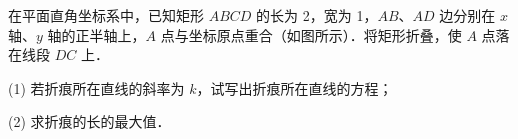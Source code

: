 \begin{question}
在平面直角坐标系中，已知矩形 $ABCD$ 的长为 2，宽为 1，$AB$、$AD$ 边分别在 $x$ 轴、$y$ 轴的正半轴上，$A$ 点与坐标原点重合（如图所示）．将矩形折叠，使 $A$ 点落在线段 $DC$ 上．
\nopagebreak[4]
\begin{center}\end{center}
\nopagebreak[4]
(1) 若折痕所在直线的斜率为 $k$，试写出折痕所在直线的方程；

(2) 求折痕的长的最大值．

\end{question}